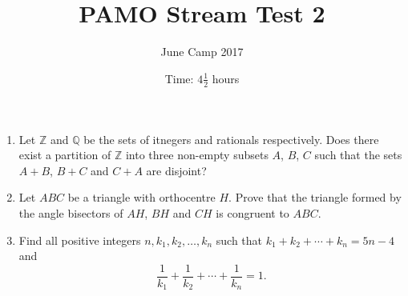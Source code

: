 \documentclass{article}
\title{PAMO Stream Test 2}
\author{June Camp 2017}
\date{Time: $4\frac{1}{2}$ hours}
\begin{document}
 \maketitle

\begin{enumerate}

\item %
	Let $\mathbb{Z}$ and $\mathbb{Q}$ be the sets of itnegers and rationals respectively. Does there exist a partition of $\mathbb{Z}$ into three non-empty subsets $A$, $B$, $C$ such that the sets $A+B$, $B+C$ and $C+A$ are disjoint?

\item %
	Let $ABC$ be a triangle with orthocentre $H$. Prove that the triangle formed by the angle bisectors of $AH$, $BH$ and $CH$ is congruent to $ABC$.

\item %
	Find all positive integers $n, k_1, k_2, \dotsc, k_n$ such that $k_1 +k_2 +\dotsb +k_n = 5n-4$ and \[\frac{1}{k_1} +\frac{1}{k_2} +\dotsb +\frac{1}{k_n} =1.\]

\end{enumerate}
\end{document}

